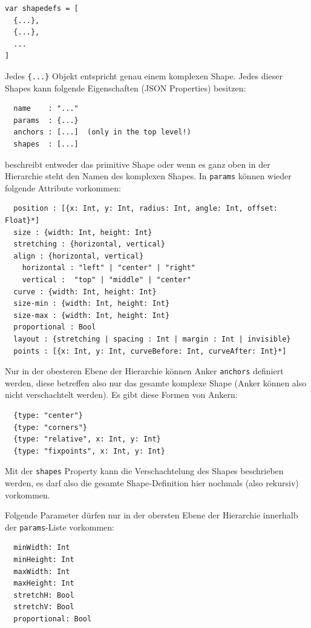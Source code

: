 \begin{verbatim}
var shapedefs = [
  {...},
  {...},
  ...
]
\end{verbatim}

\noindent Jedes \verb|{...}| Objekt entspricht genau einem komplexen Shape.
Jedes dieser Shapes kann folgende Eigenschaften (JSON Properties) besitzen:

\begin{verbatim}
  name    : "..."
  params  : {...}
  anchors : [...]  (only in the top level!)
  shapes  : [...]
\end{verbatim}

 beschreibt entweder das primitive Shape oder wenn es ganz oben
in der Hierarchie steht den Namen des komplexen Shapes.
In {\tt params} können wieder folgende Attribute vorkommen:

\begin{verbatim}
  position : [{x: Int, y: Int, radius: Int, angle: Int, offset: Float}*]
  size : {width: Int, height: Int}
  stretching : {horizontal, vertical}
  align : {horizontal, vertical}
    horizontal : "left" | "center" | "right"
    vertical :  "top" | "middle" | "center"
  curve : {width: Int, height: Int}
  size-min : {width: Int, height: Int}
  size-max : {width: Int, height: Int}
  proportional : Bool
  layout : {stretching | spacing : Int | margin : Int | invisible}
  points : [{x: Int, y: Int, curveBefore: Int, curveAfter: Int}*]
\end{verbatim}

\noindent Nur in der obesteren Ebene der Hierarchie können Anker {\tt anchors} definiert werden,
diese betreffen also nur das gesamte komplexe Shape (Anker können also
nicht verschachtelt werden). Es gibt diese Formen von Ankern:

\begin{verbatim}
  {type: "center"}
  {type: "corners"}
  {type: "relative", x: Int, y: Int}
  {type: "fixpoints", x: Int, y: Int}
\end{verbatim}

\noindent Mit der {\tt shapes} Property kann die Verschachtelung des Shapes beschrieben
werden, es darf also die gesamte Shape-Definition hier nochmals (also
rekursiv) vorkommen.

Folgende Parameter dürfen nur in der obersten Ebene der Hierarchie innerhalb
der {\tt params}-Liste vorkommen:

\begin{verbatim}
  minWidth: Int
  minHeight: Int
  maxWidth: Int
  maxHeight: Int
  stretchH: Bool
  stretchV: Bool
  proportional: Bool
\end{verbatim}

